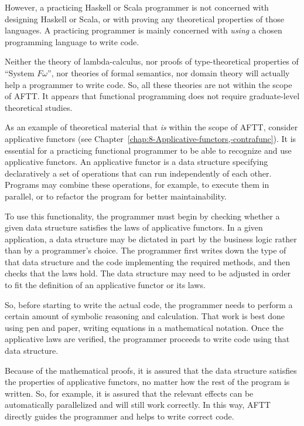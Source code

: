 However, a practicing Haskell or Scala programmer is not concerned
with designing Haskell or Scala, or with proving any theoretical properties
of those languages. A practicing programmer is mainly concerned with
\emph{using} a chosen programming language to write code. 

Neither the theory of lambda-calculus, nor proofs of type-theoretical
properties of ``System $F\omega$'', nor theories of formal semantics,
nor domain theory will actually help a programmer to write code. So,
all these theories are not within the scope of AFTT. It appears that
functional programming does not require graduate-level theoretical
studies.

As an example of theoretical material that \emph{is} within the scope
of AFTT, consider applicative functors (see Chapter~\ref{chap:8-Applicative-functors,-contrafunc}).
It is essential for a practicing functional programmer to be able
to recognize and use applicative functors. An applicative functor
is a data structure specifying declaratively a set of operations that
can run independently of each other. Programs may combine these operations,
for example, to execute them in parallel, or to refactor the program
for better maintainability.

To use this functionality, the programmer must begin by checking whether
a given data structure satisfies the laws of applicative functors.
In a given application, a data structure may be dictated in part by
the business logic rather than by a programmer's choice. The programmer
first writes down the type of that data structure and the code implementing
the required methods, and then checks that the laws hold. The data
structure may need to be adjusted in order to fit the definition of
an applicative functor or its laws.

So, before starting to write the actual code, the programmer needs
to perform a certain amount of symbolic reasoning and calculation.
That work is best done using pen and paper, writing equations in a
mathematical notation. Once the applicative laws are verified, the
programmer proceeds to write code using that data structure.

Because of the mathematical proofs, it is assured that the data structure
satisfies the properties of applicative functors, no matter how the
rest of the program is written. So, for example, it is assured that
the relevant effects can be automatically parallelized and will still
work correctly. In this way, AFTT directly guides the programmer and
helps to write correct code.

